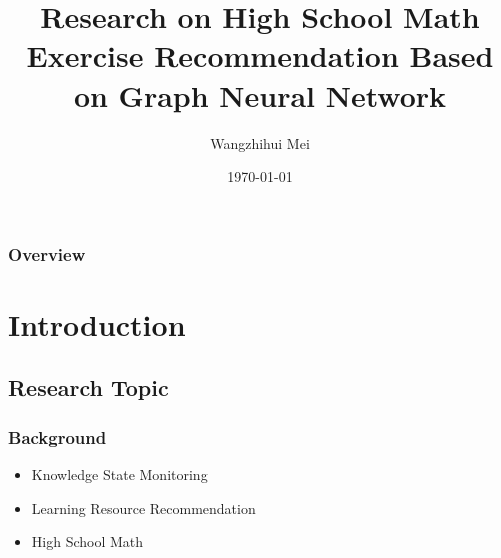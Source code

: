 \documentclass{beamer}
\title[Exercise Recommendation]{Research on High School Math Exercise Recommendation Based on Graph Neural Network} %
\author{Wangzhihui Mei} %
\institute[UOW] 
{
University of Wollongong \\ %
\medskip
\textit{maywzh@gmail.com} %
}
\date{\today} %
\begin{document}
\begin{frame}
  \titlepage %
\end{frame}

\begin{frame}
  \frametitle{Overview} %
  \tableofcontents %
\end{frame}


\section{Introduction} %

\subsection{Research Topic}
\begin{frame}
  \frametitle{Background}
  \begin{itemize}
    \item Knowledge State Monitoring
    \item Learning Resource Recommendation
    \item High School Math
  \end{itemize}
\end{frame}
\end{document}
